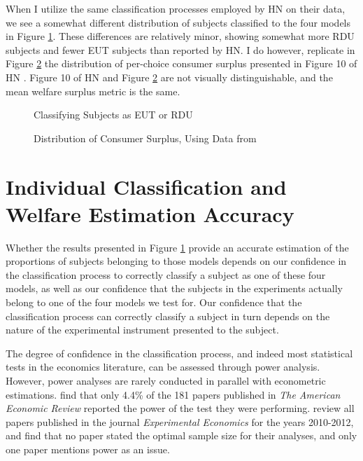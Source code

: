 \documentclass[../main.tex]{subfiles}
\begin{document}
When I utilize the same classification processes employed by HN on their data, we see a somewhat different distribution of subjects classified to the four models in Figure \ref{fig:HN_pvals}.
These differences are relatively minor, showing somewhat more RDU subjects and fewer EUT subjects than reported by HN.
I do however, replicate in Figure \ref{fig:HN_CS} the distribution of per-choice consumer surplus presented in Figure 10 of HN \parencite[108]{Harrison2016}.
Figure 10 of HN and Figure \ref{fig:HN_CS} are not visually distinguishable, and the mean welfare surplus metric is the same.

\begin{figure}[h!]
	\center
	\caption{Classifying Subjects as EUT or RDU}
	\label{fig:HN_pvals}
\end{figure}

\begin{figure}[h!]
	\center
	\caption{Distribution of Consumer Surplus, Using Data from \textcite{Harrison2016}}
	\label{fig:HN_CS}
\end{figure}

\singlespacing
\section{Individual Classification and Welfare Estimation Accuracy}
\doublespacing
\label{sec4:IC}

Whether the results presented in Figure \ref{fig:HN_pvals} provide an accurate estimation of the proportions of subjects belonging to those models depends on our confidence in the classification process to correctly classify a subject as one of these four models, as well as our confidence that the subjects in the experiments actually belong to one of the four models we test for.
Our confidence that the classification process can correctly classify a subject in turn depends on the nature of the experimental instrument presented to the subject.

The degree of confidence in the classification process, and indeed most statistical tests in the economics literature, can be assessed through power analysis.{\footnotemark}
However, power analyses are rarely conducted in parallel with econometric estimations.
\textcite{McCloskey1996} find that only 4.4\% of the 181 papers published in \textit{The American Economic Review} reported the power of the test they were performing.
\textcite[6]{Zhang2013} review all papers published in the journal \textit{Experimental Economics} for the years 2010-2012, and find that no paper stated the optimal sample size for their analyses, and only one paper mentions power as an issue.
\end{document}
